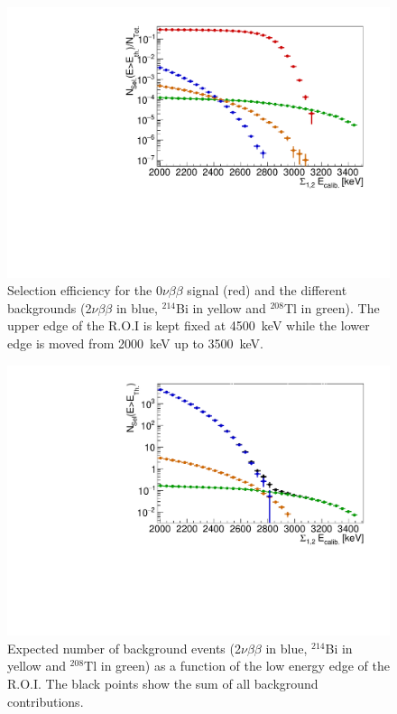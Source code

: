\documentclass[main.tex]{subfiles}
\begin{document}
\begin{figure}[h!]
\centering
\includegraphics[scale=0.6]{pictures/Chap4/EffExample.pdf}
\caption{Selection efficiency for the 0$\nu\beta\beta$ signal (red) and the different backgrounds (2$\nu\beta\beta$ in blue, $^{\text{214}}$Bi in yellow and $^{\text{208}}$Tl in green). The upper edge of the R.O.I is kept fixed at 4500~keV while the lower edge is moved from 2000~keV up to 3500~keV.}
\label{SelectionEfficiency}
\end{figure}


\begin{figure}[h!]
\centering
\includegraphics[scale=0.6]{pictures/Chap4/BkgExample.pdf}

\caption{Expected number of background events (2$\nu\beta\beta$ in blue, $^{\text{214}}$Bi in yellow and $^{\text{208}}$Tl in green) as a function of the low energy edge of the R.O.I. The black points show the sum of all background contributions.}
\label{ExpectedNumberofEvent}
\end{figure}
\end{document}
